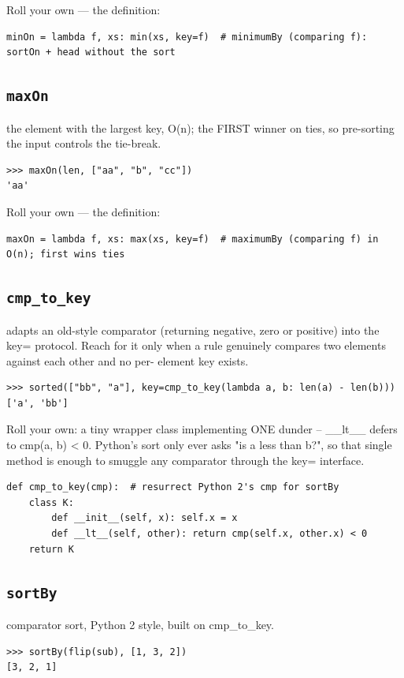 \documentclass[10pt,letterpaper]{book}
\begin{document}
Roll your own --- the definition:

\begin{lstlisting}[style=ex]
minOn = lambda f, xs: min(xs, key=f)  # minimumBy (comparing f): sortOn + head without the sort
\end{lstlisting}
\subsection{\texttt{maxOn}}\label{def:maxOn}
the element with the largest key, O(n); the FIRST winner on ties, so pre-sorting the input controls the tie-break.
\begin{lstlisting}[style=ex]
>>> maxOn(len, ["aa", "b", "cc"])
'aa'
\end{lstlisting}

Roll your own --- the definition:

\begin{lstlisting}[style=ex]
maxOn = lambda f, xs: max(xs, key=f)  # maximumBy (comparing f) in O(n); first wins ties
\end{lstlisting}
\subsection{\texttt{cmp\_to\_key}}\label{def:cmp-to-key}
adapts an old-style comparator (returning negative, zero or positive) into the key= protocol. Reach for it only when a rule genuinely compares two elements against each other and no per- element key exists.
\begin{lstlisting}[style=ex]
>>> sorted(["bb", "a"], key=cmp_to_key(lambda a, b: len(a) - len(b)))
['a', 'bb']
\end{lstlisting}

Roll your own: a tiny wrapper class implementing ONE dunder -- \_\_lt\_\_ defers to cmp(a, b) < 0. Python's sort only ever asks "is a less than b?", so that single method is enough to smuggle any comparator through the key= interface.

\begin{lstlisting}[style=ex]
def cmp_to_key(cmp):  # resurrect Python 2's cmp for sortBy
    class K:
        def __init__(self, x): self.x = x
        def __lt__(self, other): return cmp(self.x, other.x) < 0
    return K
\end{lstlisting}

\subsection{\texttt{sortBy}}\label{def:sortBy}
comparator sort, Python 2 style, built on cmp\_to\_key.
\begin{lstlisting}[style=ex]
>>> sortBy(flip(sub), [1, 3, 2])
[3, 2, 1]
\end{lstlisting}
\end{document}
